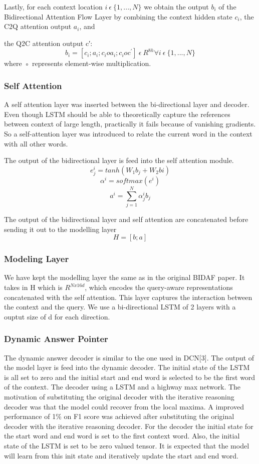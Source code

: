 \documentclass{article} %
\begin{document}
Lastly, for each context location $i \ \epsilon \ \{1,...,N\}$ we obtain the output $b_i$ of the Bidirectional Attention Flow Layer by combining the context hidden state $c_i$, the C2Q attention output $a_i$, and

the Q2C attention output c′:
$$b_{i} =[c_{i};a_{i};c_{i}oa_{i};c_{i} o c^{'}] \ \epsilon \ R^{8h} \forall i \ \epsilon \ \{1,...,N\}$$
where ◦ represents element-wise multiplication.


\subsubsection{Self Attention}
A self attention layer was inserted between the bi-directional layer and decoder. Even though LSTM should be able to theoretically capture the references between context of large length, practically it fails because of vanishing gradients. So a self-attention layer was introduced to relate the current word in the context with all other words.

The output of the bidirectional layer is feed into the self attention module.
$$e^{i}_{j} = tanh(W_{1}b_{j} + W_{2}b{i})$$
$$\alpha^{i} = softmax(e^{i})$$
$$a^{i} = \sum_{j=1}^{N}\alpha^{i}_{j}b_{j}$$

The output of the bidirectional layer and self attention are concatenated before sending it out to the modelling layer
$$H = [b; a]$$

\subsubsection{Modeling Layer}
We have kept the modelling layer the same as in the original BIDAF paper. It takes in H which is $R^{N x 16d}$, which encodes the query-aware representations concatenated with the self attention. This layer captures the interaction between the context and the query. We use a bi-directional LSTM of 2 layers with a ouptut size of d for each direction.




\subsubsection{Dynamic Answer Pointer}
The dynamic answer decoder is similar to the one used in DCN[3]. The output of the model layer is feed into the dynamic decoder. The initial state of the LSTM is all set to zero and the initial start and end word is selected to be the first word of the context. The decoder using a LSTM and a highway max network. The motivation of substituting the original decoder with the iterative reasoning decoder was that the model could recover from the local maxima. A improved performance of 1\% on F1 score was achieved after substituting the original decoder with the iterative reasoning decoder.
For the decoder the initial state for the start word and end word is set to the first context word. Also, the initial state of the LSTM is set to be zero valued tensor. It is expected that the model will learn from this init state and iteratively update the start and end word.
\end{document}
